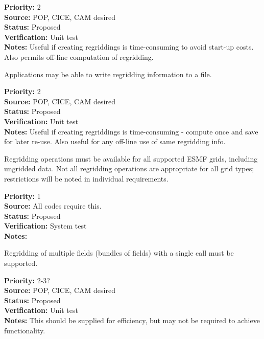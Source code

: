 \begin{reqlist}
{\bf Priority:} 2 \\
{\bf Source:} POP, CICE, CAM desired \\
{\bf Status:} Proposed \\
{\bf Verification:} Unit test \\
{\bf Notes:} Useful if creating regriddings is time-consuming to avoid
             start-up costs. Also permits off-line computation of regridding.
\end{reqlist}


Applications may be able to write regridding information to a file.

\begin{reqlist}
{\bf Priority:} 2 \\
{\bf Source:} POP, CICE, CAM desired \\
{\bf Status:} Proposed \\
{\bf Verification:} Unit test \\
{\bf Notes:} Useful if creating regriddings is time-consuming - compute once
             and save for later re-use.  Also useful for any off-line
             use of same regridding info.
\end{reqlist}


Regridding operations must be available for all supported ESMF grids,
including ungridded data.  Not all regridding operations are appropriate for 
all grid types; restrictions will be noted in individual requirements.

\begin{reqlist}
{\bf Priority:} 1 \\
{\bf Source:} All codes require this. \\
{\bf Status:} Proposed \\
{\bf Verification:} System test \\
{\bf Notes:} 
\end{reqlist}


Regridding of multiple fields (bundles of fields) with
a single call must be supported.

\begin{reqlist}
{\bf Priority:} 2-3? \\
{\bf Source:} POP, CICE, CAM desired \\
{\bf Status:} Proposed \\
{\bf Verification:} Unit test \\
{\bf Notes:} This should be supplied for efficiency, but may not
             be required to achieve functionality.
\end{reqlist}

